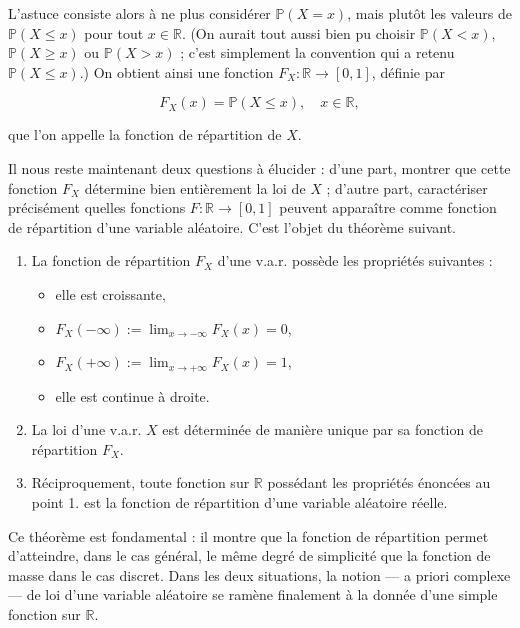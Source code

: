 L'astuce consiste alors à ne plus considérer $\mathbb{P}(X = x)$, mais plutôt les valeurs de $\mathbb{P}(X \leq x)$ pour tout $x \in \mathbb{R}$. (On aurait tout aussi bien pu choisir $\mathbb{P}(X < x)$, $\mathbb{P}(X \geq x)$ ou $\mathbb{P}(X > x)$ ; c'est simplement la convention qui a retenu $\mathbb{P}(X \leq x)$.) On obtient ainsi une fonction $F_X : \mathbb{R} \to [0,1]$, définie par

$$
F_X(x) = \mathbb{P}(X \leq x), \quad x \in \mathbb{R},
$$

que l'on appelle la fonction de répartition de $X$.

Il nous reste maintenant deux questions à élucider : d'une part, montrer que cette fonction $F_X$ détermine bien entièrement la loi de $X$ ; d'autre part, caractériser précisément quelles fonctions $F : \mathbb{R} \to [0,1]$ peuvent apparaître comme fonction de répartition d'une variable aléatoire. C'est l'objet du théorème suivant.

\medskip

\begin{mdframed}
\begin{theoreme}
\begin{enumerate}
\item La fonction de répartition $F_X$ d'une v.a.r. possède les propriétés suivantes :
\begin{itemize}
\item elle est croissante,
\item $F_X(-\infty) := \lim_{x \to -\infty} F_X(x) = 0$,
\item $F_X(+\infty) := \lim_{x \to +\infty} F_X(x) = 1$,
\item elle est continue à droite.
\end{itemize}
\item La loi d'une v.a.r. $X$ est déterminée de manière unique par sa fonction de répartition $F_X$.
\item Réciproquement, toute fonction sur $\mathbb{R}$ possédant les propriétés énoncées au point 1. est la fonction de répartition d'une variable aléatoire réelle.
\end{enumerate}
\end{theoreme}
\end{mdframed}

Ce théorème est fondamental : il montre que la fonction de répartition permet d'atteindre, dans le cas général, le même degré de simplicité que la fonction de masse dans le cas discret. Dans les deux situations, la notion — a priori complexe — de loi d'une variable aléatoire se ramène finalement à la donnée d'une simple fonction sur $\mathbb{R}$.

